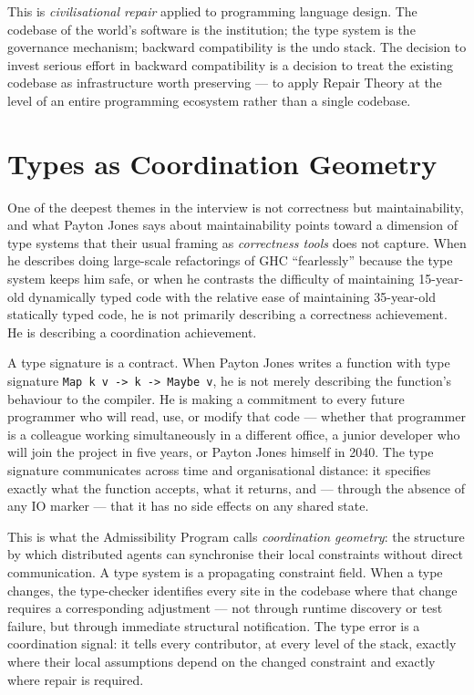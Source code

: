\documentclass[12pt]{article}
\begin{document}
This is \emph{civilisational repair} applied to programming language design.
The codebase of the world's software is the institution; the type system is the
governance mechanism; backward compatibility is the undo stack. The decision to
invest serious effort in backward compatibility is a decision to treat the
existing codebase as infrastructure worth preserving — to apply Repair Theory at
the level of an entire programming ecosystem rather than a single codebase.

\section{Types as Coordination Geometry}

One of the deepest themes in the interview is not correctness but
maintainability, and what Payton Jones says about maintainability points toward
a dimension of type systems that their usual framing as \emph{correctness tools}
does not capture. When he describes doing large-scale refactorings of GHC
``fearlessly'' because the type system keeps him safe, or when he contrasts the
difficulty of maintaining 15-year-old dynamically typed code with the relative
ease of maintaining 35-year-old statically typed code, he is not primarily
describing a correctness achievement. He is describing a coordination achievement.

A type signature is a contract. When Payton Jones writes a function with type
signature \texttt{Map k v -> k -> Maybe v}, he is not merely describing the
function's behaviour to the compiler. He is making a commitment to every future
programmer who will read, use, or modify that code — whether that programmer is
a colleague working simultaneously in a different office, a junior developer who
will join the project in five years, or Payton Jones himself in 2040. The type
signature communicates across time and organisational distance: it specifies
exactly what the function accepts, what it returns, and — through the absence of
any IO marker — that it has no side effects on any shared state.

This is what the Admissibility Program calls \emph{coordination geometry}: the
structure by which distributed agents can synchronise their local constraints
without direct communication. A type system is a propagating constraint field.
When a type changes, the type-checker identifies every site in the codebase
where that change requires a corresponding adjustment — not through runtime
discovery or test failure, but through immediate structural notification. The
type error is a coordination signal: it tells every contributor, at every level
of the stack, exactly where their local assumptions depend on the changed
constraint and exactly where repair is required.
\end{document}
